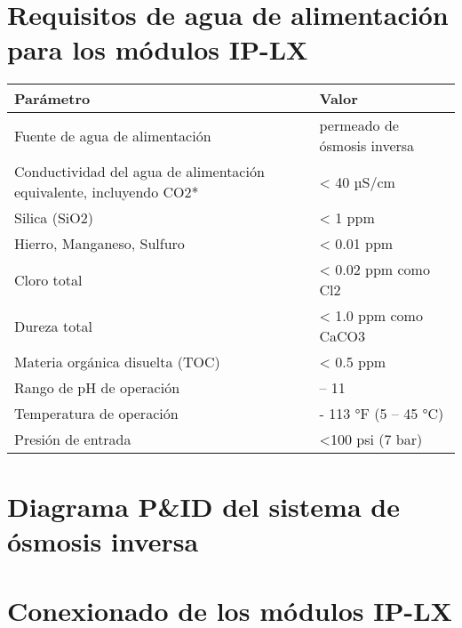 
\begin{appendixs}
    \fontsize{10}{12}\selectfont
    \section{Requisitos de agua de alimentación para los módulos IP-LX}
    \renewcommand{\arraystretch}{1} %
    \begin{longtable}{|>{\raggedright\arraybackslash}m{8cm} |>{\raggedright\arraybackslash}m{8cm}|}
        \toprule
        \textbf{Parámetro}                                                  & \textbf{Valor}              \\
        \midrule
        Fuente de agua de alimentación                                      & permeado de ósmosis inversa \\
        \hline
        Conductividad del agua de alimentación equivalente, incluyendo CO2* & < 40 µS/cm                  \\
        \hline
        Silica (SiO2)                                                       & < 1 ppm                     \\
        \hline
        Hierro, Manganeso, Sulfuro                                          & < 0.01 ppm                  \\
        \hline
        Cloro total                                                         & < 0.02 ppm como Cl2         \\
        \hline
        Dureza total                                                        & < 1.0 ppm como CaCO3        \\
        \hline
        Materia orgánica disuelta (TOC)                                     & < 0.5 ppm                   \\
        \hline
        Rango de pH de operación                                            & 4 – 11                      \\
        \hline
        Temperatura de operación                                            & 41 - 113 °F (5 – 45 °C)     \\
        \hline
        Presión de entrada                                                  & <100 psi (7 bar)            \\
        \bottomrule
    \end{longtable}
    \section{Diagrama P\&ID del sistema de ósmosis inversa}
    \section{Conexionado de los módulos IP-LX}

\end{appendixs}